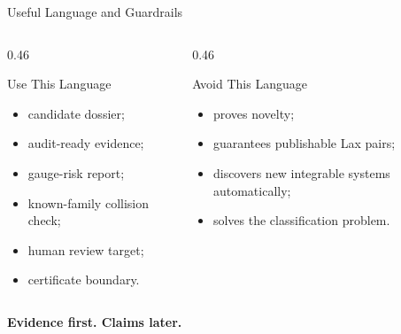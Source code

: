 \documentclass[aspectratio=169,11pt]{beamer}
\newcommand{\EvidenceRule}{\textbf{Evidence first. Claims later.}}
\begin{document}
\begin{frame}{Useful Language and Guardrails}
  \begin{columns}[T,totalwidth=\textwidth]
    \begin{column}{0.46\textwidth}
      \begin{block}{Use This Language}
        \begin{itemize}
          \item candidate dossier;
          \item audit-ready evidence;
          \item gauge-risk report;
          \item known-family collision check;
          \item human review target;
          \item certificate boundary.
        \end{itemize}
      \end{block}
    \end{column}
    \begin{column}{0.46\textwidth}
      \begin{alertblock}{Avoid This Language}
        \begin{itemize}
          \item proves novelty;
          \item guarantees publishable Lax pairs;
          \item discovers new integrable systems automatically;
          \item solves the classification problem.
        \end{itemize}
      \end{alertblock}
    \end{column}
  \end{columns}
  \vspace{0.2cm}
  \begin{center}
    \Large \EvidenceRule
  \end{center}
\end{frame}
\end{document}
